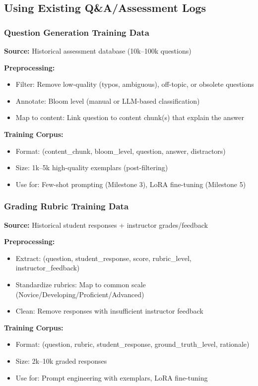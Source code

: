 \documentclass[11pt,letterpaper]{article}
\begin{document}
\subsection{Using Existing Q\&A/Assessment Logs}

\subsubsection{Question Generation Training Data}

\textbf{Source:} Historical assessment database (10k--100k questions)

\textbf{Preprocessing:}
\begin{itemize}
\item Filter: Remove low-quality (typos, ambiguous), off-topic, or obsolete questions
\item Annotate: Bloom level (manual or LLM-based classification)
\item Map to content: Link question to content chunk(s) that explain the answer
\end{itemize}

\textbf{Training Corpus:}
\begin{itemize}
\item Format: (content\_chunk, bloom\_level, question, answer, distractors)
\item Size: 1k--5k high-quality exemplars (post-filtering)
\item Use for: Few-shot prompting (Milestone 3), LoRA fine-tuning (Milestone 5)
\end{itemize}

\subsubsection{Grading Rubric Training Data}

\textbf{Source:} Historical student responses + instructor grades/feedback

\textbf{Preprocessing:}
\begin{itemize}
\item Extract: (question, student\_response, score, rubric\_level, instructor\_feedback)
\item Standardize rubrics: Map to common scale (Novice/Developing/Proficient/Advanced)
\item Clean: Remove responses with insufficient instructor feedback
\end{itemize}

\textbf{Training Corpus:}
\begin{itemize}
\item Format: (question, rubric, student\_response, ground\_truth\_level, rationale)
\item Size: 2k--10k graded responses
\item Use for: Prompt engineering with exemplars, LoRA fine-tuning
\end{itemize}
\end{document}
